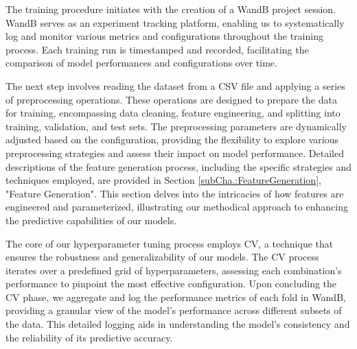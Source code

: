 \documentclass{article} %
\begin{document}
The training procedure initiates with the creation of a \gls{WandB} project session. \gls{WandB} serves as an experiment tracking platform, enabling us to systematically log and monitor various metrics and configurations throughout the training process. Each training run is timestamped and recorded, facilitating the comparison of model performances and configurations over time. 

The next step involves reading the dataset from a CSV file and applying a series of preprocessing operations. These operations are designed to prepare the data for training, encompassing data cleaning, feature engineering, and splitting into training, validation, and test sets. The preprocessing parameters are dynamically adjusted based on the configuration, providing the flexibility to explore various preprocessing strategies and assess their impact on model performance. Detailed descriptions of the feature generation process, including the specific strategies and techniques employed, are provided in Section \ref{subCha.:FeatureGeneration}, "Feature Generation". This section delves into the intricacies of how features are engineered and parameterized, illustrating our methodical approach to enhancing the predictive capabilities of our models. 

The core of our hyperparameter tuning process employs \gls{CV}, a technique that ensures the robustness and generalizability of our models. The \gls{CV} process iterates over a predefined grid of hyperparameters, assessing each combination's performance to pinpoint the most effective configuration. Upon concluding the \gls{CV} phase, we aggregate and log the performance metrics of each fold in \gls{WandB}, providing a granular view of the model's performance across different subsets of the data. This detailed logging aids in understanding the model's consistency and the reliability of its predictive accuracy. 
\end{document}
